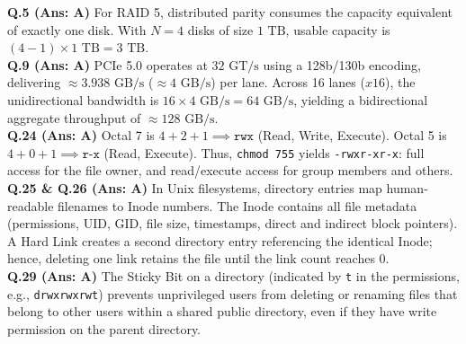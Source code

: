 \begin{solutionbox}
\textbf{Q.5 (Ans: A)} For RAID 5, distributed parity consumes the capacity equivalent of exactly one disk. With $N = 4$ disks of size $1\text{ TB}$, usable capacity is $(4 - 1) \times 1\text{ TB} = 3\text{ TB}$.\\[2mm]
\textbf{Q.9 (Ans: A)} PCIe 5.0 operates at $32\text{ GT/s}$ using a 128b/130b encoding, delivering $\approx 3.938\text{ GB/s}$ ($\approx 4\text{ GB/s}$) per lane. Across 16 lanes ($x16$), the unidirectional bandwidth is $16 \times 4\text{ GB/s} = 64\text{ GB/s}$, yielding a bidirectional aggregate throughput of $\approx 128\text{ GB/s}$.\\[2mm]
\textbf{Q.24 (Ans: A)} Octal 7 is $4+2+1 \implies \texttt{rwx}$ (Read, Write, Execute). Octal 5 is $4+0+1 \implies \texttt{r-x}$ (Read, Execute). Thus, \texttt{chmod 755} yields \texttt{-rwxr-xr-x}: full access for the file owner, and read/execute access for group members and others.\\[2mm]
\textbf{Q.25 \& Q.26 (Ans: A)} In Unix filesystems, directory entries map human-readable filenames to Inode numbers. The Inode contains all file metadata (permissions, UID, GID, file size, timestamps, direct and indirect block pointers). A Hard Link creates a second directory entry referencing the identical Inode; hence, deleting one link retains the file until the link count reaches 0.\\[2mm]
\textbf{Q.29 (Ans: A)} The Sticky Bit on a directory (indicated by \texttt{t} in the permissions, e.g., \texttt{drwxrwxrwt}) prevents unprivileged users from deleting or renaming files that belong to other users within a shared public directory, even if they have write permission on the parent directory.
\end{solutionbox}

\newpage
